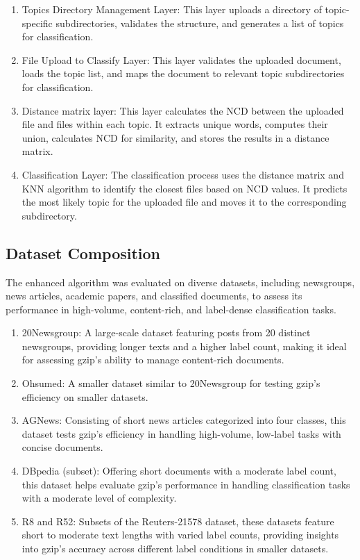 \documentclass{article}
\begin{document}
\begin{enumerate}
    \item Topics Directory Management Layer: This layer uploads a directory of topic-specific subdirectories, validates the structure, and generates a list of topics for classification.
    \item File Upload to Classify Layer: This layer validates the uploaded document, loads the topic list, and maps the document to relevant topic subdirectories for classification.
    \item Distance matrix layer: This layer calculates the NCD between the uploaded file and files within each topic. It extracts unique words, computes their union, calculates NCD for similarity, and stores the results in a distance matrix.
    \item Classification Layer: The classification process uses the distance matrix and KNN algorithm to identify the closest files based on NCD values. It predicts the most likely topic for the uploaded file and moves it to the corresponding subdirectory.
\end{enumerate}
\subsection{Dataset Composition}

The enhanced algorithm was evaluated on diverse datasets, including newsgroups, news articles, academic papers, and classified documents, to assess its performance in high-volume, content-rich, and label-dense classification tasks.

\begin{enumerate}
    \item 20Newsgroup: A large-scale dataset featuring posts from 20 distinct newsgroups, providing longer texts and a higher label count, making it ideal for assessing gzip’s ability to manage content-rich documents.
    \item Ohsumed: A smaller dataset similar to 20Newsgroup for testing gzip’s efficiency on smaller datasets.
    \item AGNews: Consisting of short news articles categorized into four classes, this dataset tests gzip’s efficiency in handling high-volume, low-label tasks with concise documents.
    \item DBpedia (subset): Offering short documents with a moderate label count, this dataset helps evaluate gzip’s performance in handling classification tasks with a moderate level of complexity.
    \item R8 and R52: Subsets of the Reuters-21578 dataset, these datasets feature short to moderate text lengths with varied label counts, providing insights into gzip's accuracy across different label conditions in smaller datasets.
\end{enumerate}
\end{document}
